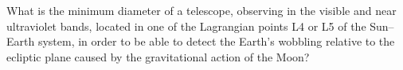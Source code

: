What is the minimum diameter of a telescope, observing in the visible and near
ultraviolet bands, located in one of the Lagrangian points L4 or L5 of the
Sun--Earth system, in order to be able to detect the Earth's wobbling relative
to the ecliptic plane caused by the gravitational action of the Moon?
